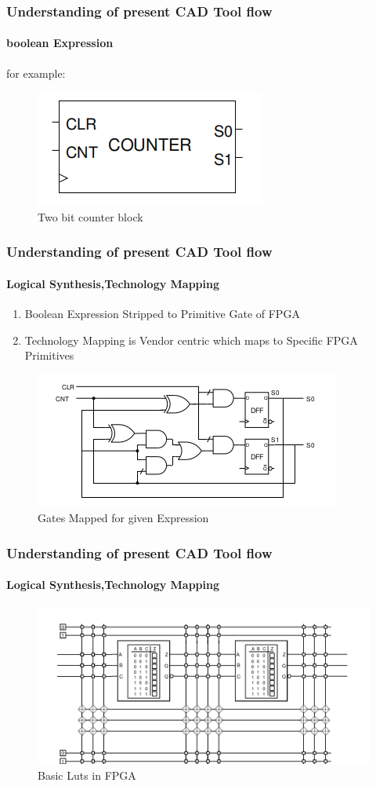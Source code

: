 \documentclass{beamer}
\begin{document}
\begin{frame}[fragile]
    \frametitle{Understanding of present CAD Tool flow}
    \framesubtitle{boolean Expression}
     for example:
\begin{figure}
    \centering
    \includegraphics[width=0.35\linewidth]{slides/images/basic_block.png}
    \caption{Two bit counter block}
    \label{exa_block}
\end{figure}
\end{frame}

\begin{frame}[fragile]
    \frametitle{Understanding of present CAD Tool flow}
    \framesubtitle{Logical Synthesis,Technology Mapping}
    \begin{enumerate}
        \item Boolean Expression Stripped to Primitive Gate of FPGA
        \item Technology Mapping is Vendor centric which maps to Specific FPGA Primitives
    \end{enumerate}
    \begin{figure}
        \includegraphics[width=0.5\linewidth]{slides/images/netlist_gate.png}
        \caption{Gates Mapped for given Expression}
        \label{exa_mapgate}
    \end{figure}
\end{frame}

\begin{frame}[fragile]
    \frametitle{Understanding of present CAD Tool flow}
    \framesubtitle{Logical Synthesis,Technology Mapping}
    \begin{figure}
        \centering
        \includegraphics[width=0.5\linewidth]{slides/images/LUT.png}
        \caption{Basic Luts in FPGA }
        \label{exa_fpgalut}
    \end{figure}
\end{frame}
\end{document}
